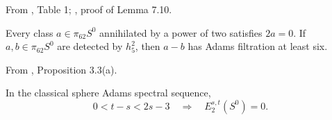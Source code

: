 \begin{proposition}
\label{sem:Literature:theta-indeterminacy}
From \cite{IWX}, Table 1; \cite{LWX126}, proof of Lemma 7.10.\par

Every class $a\in\pi_{62}S^0$ annihilated by a power of two satisfies $2a=0$. If $a,b\in\pi_{62}S^0$ are detected by $h_5^2$, then $a-b$ has Adams filtration at least six.
\end{proposition}

\begin{theorem}
\label{sem:Literature:sphere-vanishing}
From \cite{MathewTorsion}, Proposition 3.3(a).\par

In the classical sphere Adams spectral sequence,
\[0<t-s<2s-3\quad\Longrightarrow\quad E_2^{s,t}(S^0)=0.\]
\end{theorem}

